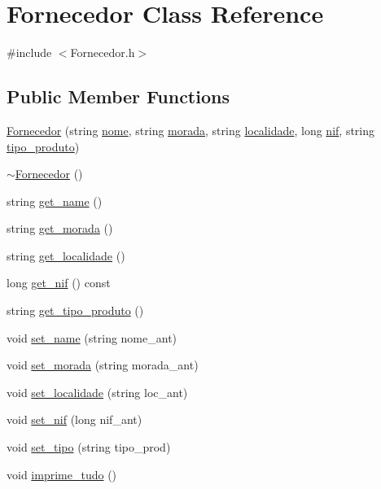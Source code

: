 \hypertarget{class_fornecedor}{
\section{Fornecedor Class Reference}
\label{class_fornecedor}
}


{\ttfamily \#include $<$Fornecedor.h$>$}

\subsection*{Public Member Functions}
\begin{DoxyCompactItemize}
\item 
\hyperlink{class_fornecedor_af667794458566967f001eb31b5dc7b87}{Fornecedor} (string \hyperlink{class_fornecedor_ab048f688016d87d0f14d77aa19589cba}{nome}, string \hyperlink{class_fornecedor_ab6847360fd388f66d57c656bd916a8f6}{morada}, string \hyperlink{class_fornecedor_a8ff7114779b124824241ee465aca2f79}{localidade}, long \hyperlink{class_fornecedor_afa19766928680454e0c5f67c298ef1c0}{nif}, string \hyperlink{class_fornecedor_aaf54ef880e221019f65111f72daa143e}{tipo\_\-produto})
\item 
\hyperlink{class_fornecedor_a29c28f4780932058649c7d20fd2125c6}{$\sim$Fornecedor} ()
\item 
string \hyperlink{class_fornecedor_a4c68836e5af79c83701be6429c51f76a}{get\_\-name} ()
\item 
string \hyperlink{class_fornecedor_a88675c0796fad959d4a3fd8992d539e5}{get\_\-morada} ()
\item 
string \hyperlink{class_fornecedor_a26cef668e863f7edc774bc781de370f5}{get\_\-localidade} ()
\item 
long \hyperlink{class_fornecedor_a324a0dc5410a126eeaa23cc22076c2c1}{get\_\-nif} () const 
\item 
string \hyperlink{class_fornecedor_a36d626a9e41c3ae5164b7543acd1d27c}{get\_\-tipo\_\-produto} ()
\item 
void \hyperlink{class_fornecedor_a3f525c9a60ec5e04f763b322fddfcf25}{set\_\-name} (string nome\_\-ant)
\item 
void \hyperlink{class_fornecedor_ac15262b5913ad4988aa8730ff61f2d46}{set\_\-morada} (string morada\_\-ant)
\item 
void \hyperlink{class_fornecedor_a1a492bd2fa2391c058a14e9ad5946deb}{set\_\-localidade} (string loc\_\-ant)
\item 
void \hyperlink{class_fornecedor_a9d71614c56a4c3925ccbcb2860ed855f}{set\_\-nif} (long nif\_\-ant)
\item 
void \hyperlink{class_fornecedor_aee89e82efa98bd55460ca7878fbcc6fc}{set\_\-tipo} (string tipo\_\-prod)
\item 
void \hyperlink{class_fornecedor_aee47754230bfae84307d46d39628ad23}{imprime\_\-tudo} ()
\end{DoxyCompactItemize}

